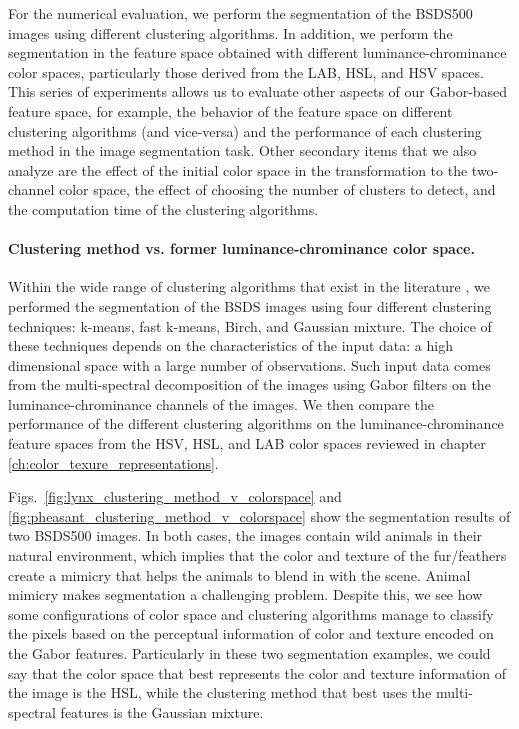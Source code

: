 For the numerical evaluation, we perform the segmentation of the BSDS500 images using different clustering algorithms. In addition, we perform the segmentation in the feature space obtained with different luminance-chrominance color spaces, particularly those derived from the LAB, HSL, and HSV spaces. This series of experiments allows us to evaluate other aspects of our Gabor-based feature space, for example, the behavior of the feature space on different clustering algorithms (and vice-versa) and the performance of each clustering method in the image segmentation task. Other secondary items that we also analyze are the effect of the initial color space in the transformation to the two-channel color space, the effect of choosing the number of clusters to detect, and the computation time of the clustering algorithms. 

\paragraph{Clustering method vs. former luminance-chrominance color space.} 

Within the wide range of clustering algorithms that exist in the literature \citep{Omran.Engelbrecht.ea:IOS:2007} \citep{Sathya.Manavalan:IJCA:2011}, we performed the segmentation of the BSDS images using four different clustering techniques: k-means, fast k-means, Birch, and Gaussian mixture. The choice of these techniques depends on the characteristics of the input data: a high dimensional space with a large number of observations. Such input data comes from the multi-spectral decomposition of the images using Gabor filters on the luminance-chrominance channels of the images. We then compare the performance of the different clustering algorithms on the luminance-chrominance feature spaces from the HSV, HSL, and LAB color spaces reviewed in chapter \ref{ch:color_texure_representations}. 

Figs.\ \ref{fig:lynx_clustering_method_v_colorspace} and \ref{fig:pheasant_clustering_method_v_colorspace} show the segmentation results of two BSDS500 images. In both cases, the images contain wild animals in their natural environment, which implies that the color and texture of the fur/feathers create a mimicry that helps the animals to blend in with the scene. Animal mimicry makes segmentation a challenging problem. Despite this, we see how some configurations of color space and clustering algorithms manage to classify the pixels based on the perceptual information of color and texture encoded on the Gabor features. Particularly in these two segmentation examples, we could say that the color space that best represents the color and texture information of the image is the HSL, while the clustering method that best uses the multi-spectral features is the Gaussian mixture. 

